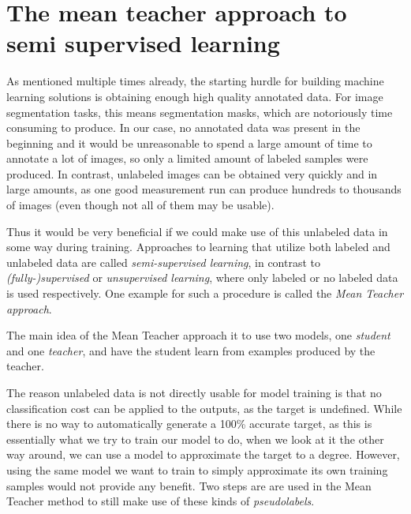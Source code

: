 \section{The mean teacher approach to semi supervised learning}
\label{sec:mean_teacher}

As mentioned multiple times already, the starting hurdle for building machine learning solutions is obtaining enough high quality annotated data. 
For image segmentation tasks, this means segmentation masks, which are notoriously time consuming to produce. 
In our case, no annotated data was present in the beginning and it would be unreasonable to spend a large amount of time to annotate a lot of images, so only a limited amount of labeled samples were produced. 
In contrast, unlabeled images can be obtained very quickly and in large amounts, as one good measurement run can produce hundreds to thousands of images (even though not all of them may be usable).

Thus it would be very beneficial if we could make use of this unlabeled data in some way during training. 
Approaches to learning that utilize both labeled and unlabeled data are called \emph{semi-supervised learning}, in contrast to \emph{(fully-)supervised} or \emph{unsupervised learning}, where only labeled or no labeled data is used respectively. 
One example for such a procedure is called the \emph{Mean Teacher approach}.\cite{tarvainenMeanTeachersAre2018}

The main idea of the Mean Teacher approach it to use two models, one \emph{student} and one \emph{teacher}, and have the student learn from examples produced by the teacher.

The reason unlabeled data is not directly usable for model training is that no classification cost can be applied to the outputs, as the target is undefined.
While there is no way to automatically generate a 100\% accurate target, as this is essentially what we try to train our model to do, when we look at it the other way around, we can use a model to approximate the target to a degree.
However, using the same model we want to train to simply approximate its own training samples would not provide any benefit.
Two steps are are used in the Mean Teacher method to still make use of these kinds of \emph{pseudolabels}.

